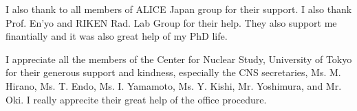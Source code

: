 I also thank to all members of ALICE Japan group for their support. 
I also thank Prof. En'yo and RIKEN Rad. Lab Group for their help. 
They also support me finantially and it was also great help of my PhD life.  

I appreciate all the members of the Center for Nuclear Study, University of Tokyo for their generous support and kindness, especially the CNS secretaries, Ms. M. Hirano, Ms. T. Endo, Ms. I. Yamamoto, Ms. Y. Kishi, Mr. Yoshimura, and Mr. Oki.
I really apprecite their great help of the office procedure. 


